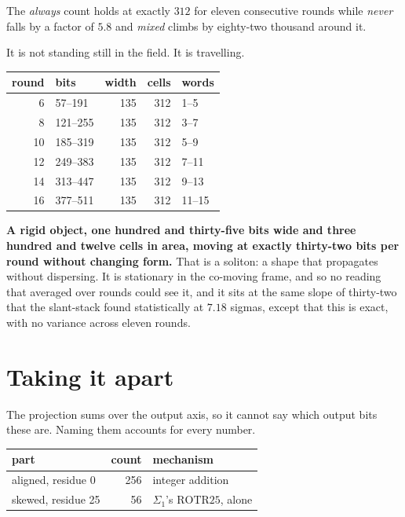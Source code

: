 The \emph{always} count holds at exactly \(312\) for eleven consecutive rounds while \emph{never}
falls by a factor of \(5.8\) and \emph{mixed} climbs by eighty-two thousand around it.

It is not standing still in the field. It is travelling.

\begin{center}
\begin{tabular}{rlrrl}
\toprule
round & bits & width & cells & words \\
\midrule
6 & 57--191 & 135 & 312 & 1--5 \\
8 & 121--255 & 135 & 312 & 3--7 \\
10 & 185--319 & 135 & 312 & 5--9 \\
12 & 249--383 & 135 & 312 & 7--11 \\
14 & 313--447 & 135 & 312 & 9--13 \\
16 & 377--511 & 135 & 312 & 11--15 \\
\bottomrule
\end{tabular}
\end{center}

\textbf{A rigid object, one hundred and thirty-five bits wide and three hundred and twelve cells in
area, moving at exactly thirty-two bits per round without changing form.} That is a soliton: a shape
that propagates without dispersing. It is stationary in the co-moving frame, and so no reading
that averaged over rounds could see it, and it sits at the same slope of thirty-two that the
slant-stack found statistically at \(7.18\) sigmas, except that this is exact, with no variance
across eleven rounds.

\section{Taking it apart}

The projection sums over the output axis, so it cannot say which output bits these are. Naming them
accounts for every number.

\begin{center}
\begin{tabular}{lrl}
\toprule
part & count & mechanism \\
\midrule
aligned, residue 0 & 256 & integer addition \\
skewed, residue 25 & 56 & \(\Sigma_1\)'s \(\mathrm{ROTR}25\), alone \\
\bottomrule
\end{tabular}
\end{center}

